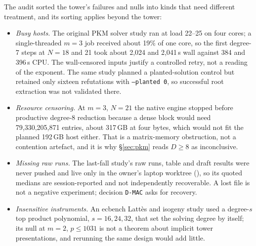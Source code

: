The audit sorted the tower's failures and nulls into kinds that need
different treatment, and its sorting applies beyond the tower:
\begin{itemize}
\item \emph{Busy hosts.} The original PKM solver study ran at load 22--25 on
  four cores; a single-threaded $m=3$ job received about 19\% of one core,
  so the first degree-7 steps at $N=18$ and 21 took about 2{,}024 and
  2{,}041\,s wall against 384 and 396\,s CPU. The wall-censored inputs
  justify a controlled retry, not a reading of the exponent. The same study
  planned a planted-solution control but retained only sixteen refutations
  with \texttt{--planted 0}, so successful root extraction was not validated
  there.
\item \emph{Resource censoring.} At $m=3$, $N=21$ the native engine stopped
  before productive degree-8 reduction because a dense block would need
  79{,}330{,}205{,}871 entries, about 317\,GB at four bytes, which would not
  fit the planned 192\,GB host either. That is a matrix-memory obstruction,
  not a contention artefact, and it is why \S\ref{sec:pkm} reads $D\ge8$ as
  inconclusive.
\item \emph{Missing raw runs.} The last-fall study's raw runs, table and
  draft results were never pushed and live only in the owner's laptop
  worktree (), so its
  quoted medians are session-reported and not independently recoverable. A
  lost file is not a negative experiment; decision \texttt{D-MAC} asks for
  recovery.
\item \emph{Insensitive instruments.} An ecbench Latt\`es and isogeny
  study used a degree-$s$ top product polynomial, $s=16,24,32$, that set the
  solving degree by itself; its null at $m=2$, $p\le1031$ is not a theorem
  about implicit tower presentations, and rerunning the same design would
  add little.
\end{itemize}

